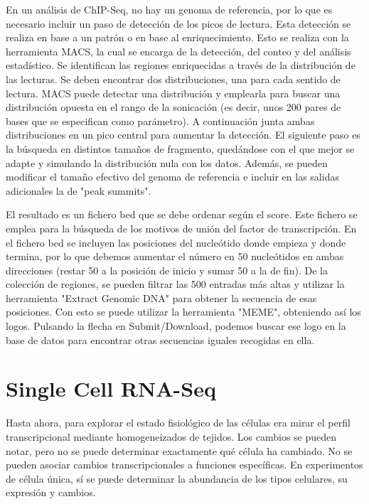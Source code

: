 En un análisis de ChIP-Seq, no hay un genoma de referencia, por lo que es necesario incluir un paso de detección de los picos de lectura. Esta detección se realiza en base a un patrón o en base al enriquecimiento. Esto se realiza con la herramienta MACS, la cual se encarga de la detección, del conteo y del análisis estadístico. Se identifican las regiones enriquecidas a través de la distribución de las lecturas. Se deben encontrar dos distribuciones, una para cada sentido de lectura. MACS puede detectar una distribución y emplearla para buscar una distribución opuesta en el rango de la sonicación (es decir, unos 200 pares de bases que se especifican como parámetro). A continuación junta ambas distribuciones en un pico central para aumentar la detección. 
El siguiente paso es la búsqueda en distintos tamaños de fragmento, quedándose con el que mejor se adapte y simulando la distribución nula con los datos. Además, se pueden modificar el tamaño efectivo del genoma de referencia e incluir en las salidas adicionales la de "peak summits". 

El resultado es un fichero bed que se debe ordenar según el score. Este fichero se emplea para la búsqueda de los motivos de unión del factor de transcripción. En el fichero bed se incluyen las posiciones del nucleótido donde empieza y donde termina, por lo que debemos aumentar el número en 50 nucleótidos en ambas direcciones (restar 50 a la posición de inicio y sumar 50 a la de fin). De la colección de regiones, se pueden filtrar las 500 entradas más altas y utilizar la herramienta "Extract Genomic DNA" para obtener la secuencia de esas posiciones. Con esto se puede utilizar la herramienta "MEME", obteniendo así los logos. Pulsando la flecha en Submit/Download, podemos buscar ese logo en la base de datos para encontrar otras secuencias iguales recogidas en ella.

\section{Single Cell RNA-Seq}
Hasta ahora, para explorar el estado fisiológico de las células era mirar el perfil transcripcional mediante homogeneizados de tejidos. Los cambios se pueden notar, pero no se puede determinar exactamente qué célula ha cambiado. No se pueden asociar cambios transcripcionales a funciones específicas. En experimentos de célula única, sí se puede determinar la abundancia de los tipos celulares, su expresión y cambios. 

